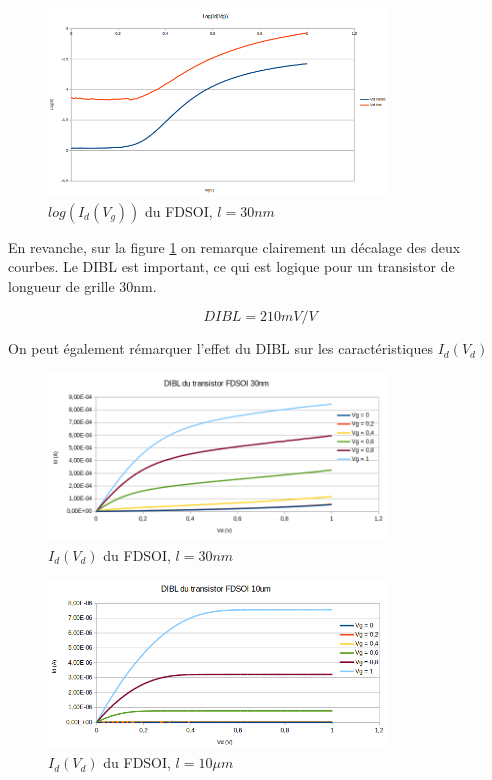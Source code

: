 \documentclass[a4paper,11pt]{report}
\begin{document}
\begin{figure}[h]
    \begin{center}
        \includegraphics[width=0.8\textwidth]{Images/logidvg30nm}
        \caption{$log(I_d(V_g))$ du FDSOI, $l = 30nm$}
        \label{logidvg_fdsoi_30nm}
    \end{center}
\end{figure}

En revanche, sur la figure \ref{logidvg_fdsoi_30nm} on remarque clairement un décalage des deux courbes. Le DIBL est important, ce qui est logique pour un transistor de longueur de grille 30nm. 

\[DIBL = 210mV/V\]

On peut également rémarquer l'effet du DIBL sur les caractéristiques $I_d(V_d)$

\begin{figure}[h]
    \begin{center}
        \includegraphics[width=0.8\textwidth]{Images/DIBL-11-30}
        \caption{$I_d(V_d)$ du FDSOI, $l = 30nm$}
        \label{DIBL_fdsoi_30nm}
    \end{center}
\end{figure}


\begin{figure}[h]
    \begin{center}
        \includegraphics[width=0.8\textwidth]{Images/DIBL-1-10}
        \caption{$I_d(V_d)$ du FDSOI, $l =10\mu m$}
        \label{DIBL_fdsoi_10um}
    \end{center}
\end{figure}
\end{document}
